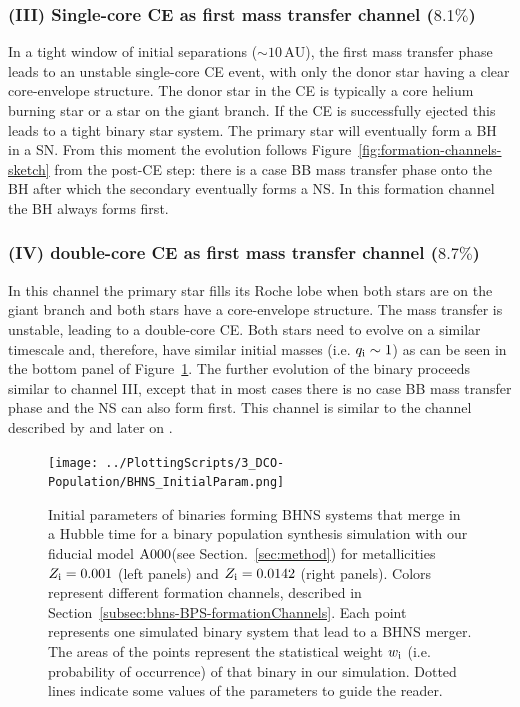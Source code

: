 \documentclass[twocolumn]{aastex63}
\newcommand\bhnsSingle{BHNS\xspace}
\newcommand\PercentageDCCE{$8.7\%$\xspace}
\newcommand\PercentageImmediateCE{$8.1\%$\xspace}
\newcommand{\qi}{\ensuremath{q_{\rm{i}}}\xspace}
\newcommand{\Zi}{\ensuremath{Z_{\rm{i}}}\xspace}
\newcommand{\AU}{\ensuremath{\,\mathrm{AU}}\xspace}
\newcommand{\mAzero}{\ensuremath{\rm{A}000}\xspace}
\begin{document}
\subsubsection{(III) Single-core \ac{CE} as first mass transfer   channel (\PercentageImmediateCE)}
%
In a tight window of initial separations ($\sim 10$\AU), the first mass transfer phase leads to an unstable single-core \ac{CE} event,  with only the donor star having a clear core-envelope structure.  The donor star in the \ac{CE} is typically a core helium burning star or a star on the giant branch. If the \ac{CE} is successfully ejected this leads to a tight binary star system. The primary star will eventually form a \ac{BH} in a \ac{SN}. From this moment the evolution follows Figure~\ref{fig:formation-channels-sketch} from the post-CE step: there is a case BB mass transfer phase onto the \ac{BH} after which the secondary eventually forms a \ac{NS}. In this formation channel the \ac{BH} always forms first. 

%
\subsubsection{(IV) double-core CE  as first mass transfer  channel  (\PercentageDCCE)}
%
In this channel the primary star fills its Roche lobe when both stars are on the giant branch and both stars  have  a core-envelope structure. The mass transfer is  unstable, leading to a double-core CE.  Both stars need to evolve on a similar timescale and, therefore,  have similar initial masses (i.e. $ \qi \sim 1$) as can be seen in the bottom panel of Figure~\ref{fig:BHNS_ZAMSmasses}. The further evolution of the binary proceeds similar to channel III, except that in most cases there is no case BB mass transfer phase and the \ac{NS} can also form first. 
This channel is similar to the channel described by \citet{1995ApJ...440..270B,1998ApJ...506..780B} and  later on \citet{Dewi:2006bx}.  \\
%



%
\begin{figure}
\texttt{[image: ../PlottingScripts/3\_DCO-Population/BHNS\_InitialParam.png]}
   \caption{Initial parameters of binaries forming \bhnsSingle systems  that merge in a Hubble time for a binary population synthesis simulation with our fiducial model \mAzero  (see Section.~\ref{sec:method}) for metallicities $\Zi=0.001$ (left panels) and $\Zi=0.0142$ (right panels). Colors represent different formation channels, described in Section~\ref{subsec:bhns-BPS-formationChannels}. Each point represents one simulated binary system that lead to a \bhnsSingle merger. The areas of the points represent the statistical weight $w_{\rm{i}}$ (i.e. probability of occurrence)  of that binary in our simulation.  Dotted lines indicate some values of the parameters to guide the reader. }
    \label{fig:BHNS_ZAMSmasses}
\end{figure}
%   
\end{document}
